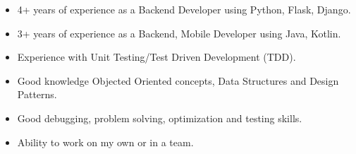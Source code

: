 

\begin{cvparagraph}

    \begin{itemize}
        \item {4+ years of experience as a Backend Developer using Python, Flask, Django.}
        \item {3+ years of experience as a Backend, Mobile Developer using Java, Kotlin.}
        \item {Experience with Unit Testing/Test Driven Development (TDD).}
        \item {Good knowledge Objected Oriented concepts, Data Structures and Design Patterns.}
        \item {Good debugging, problem solving, optimization and testing skills.}
        \item {Ability to work on my own or in a team.}
    \end{itemize}

\end{cvparagraph}
